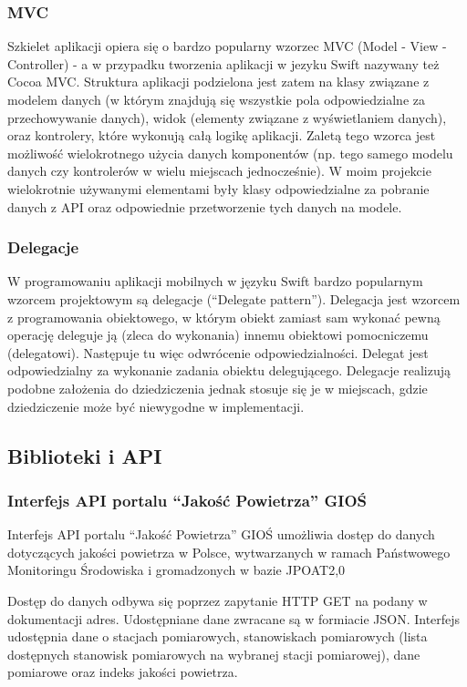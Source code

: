 \documentclass[a4paper,11pt,titlepage]{article}
\begin{document}
\subsubsection{MVC}
Szkielet aplikacji opiera się o bardzo popularny wzorzec MVC (Model - View - Controller) - a w przypadku tworzenia aplikacji w jezyku Swift nazywany też Cocoa MVC. Struktura aplikacji podzielona jest zatem na klasy związane z modelem danych (w którym znajdują się wszystkie pola odpowiedzialne za przechowywanie danych),  widok (elementy związane z wyświetlaniem danych), oraz kontrolery, które wykonują całą logikę aplikacji. Zaletą tego wzorca jest możliwość wielokrotnego użycia danych komponentów (np. tego samego modelu danych czy kontrolerów w wielu miejscach jednocześnie). W moim projekcie wielokrotnie używanymi elementami były klasy odpowiedzialne za pobranie danych z API oraz odpowiednie przetworzenie tych danych na modele.

\subsubsection{Delegacje}
W programowaniu aplikacji mobilnych w języku Swift bardzo popularnym wzorcem projektowym są delegacje (``Delegate pattern''). Delegacja jest wzorcem z programowania obiektowego, w którym obiekt zamiast sam wykonać pewną operację deleguje ją (zleca do wykonania) innemu obiektowi pomocniczemu (delegatowi). Następuje tu więc odwrócenie odpowiedzialności. Delegat jest odpowiedzialny za wykonanie zadania obiektu delegującego. Delegacje realizują podobne założenia do dziedziczenia jednak stosuje się je w miejscach, gdzie dziedziczenie może być niewygodne w implementacji.


\subsection{Biblioteki i API}
\subsubsection{Interfejs API portalu ``Jakość Powietrza'' GIOŚ}
Interfejs API portalu ``Jakość Powietrza''  GIOŚ umożliwia dostęp do danych dotyczących jakości powietrza w Polsce, wytwarzanych w ramach Państwowego Monitoringu Środowiska i gromadzonych w bazie JPOAT2,0

Dostęp do danych odbywa się poprzez zapytanie HTTP GET na podany w dokumentacji adres. Udostępniane dane zwracane są w formiacie JSON. Interfejs udostępnia dane o stacjach pomiarowych, stanowiskach pomiarowych (lista dostępnych stanowisk pomiarowych na wybranej stacji pomiarowej), dane pomiarowe oraz indeks jakości powietrza.
\end{document}
